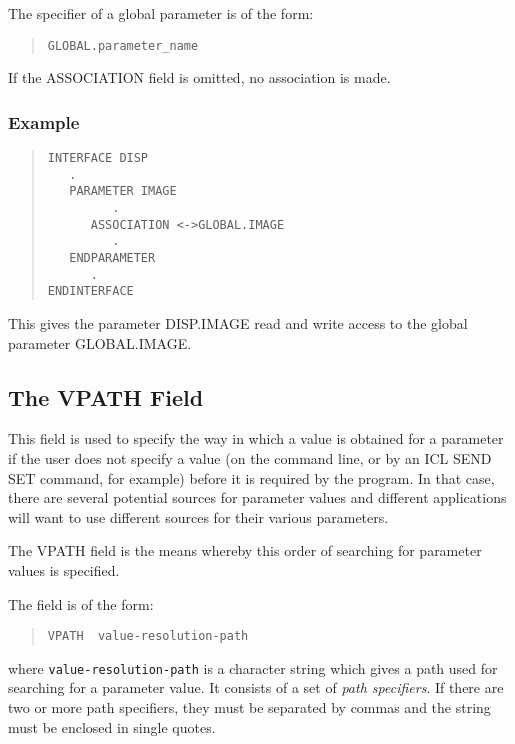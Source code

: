 \documentclass[twoside,11pt]{article}
\newcommand{\xlabel}[1]{}
\renewcommand{\_}{\texttt{\symbol{95}}}
\begin{document}
The specifier of a global parameter is of the form:
\begin{quote} \begin{verbatim}
GLOBAL.parameter_name
\end{verbatim} \end{quote}
If the ASSOCIATION field is omitted, no association is made.

\subsubsection*{Example}
\begin{quote} \begin{verbatim}
INTERFACE DISP
   .
   PARAMETER IMAGE
         .
      ASSOCIATION <->GLOBAL.IMAGE
         .
   ENDPARAMETER
      .
ENDINTERFACE
\end{verbatim} \end{quote}
This gives the parameter DISP.IMAGE read and write access to the global 
parameter GLOBAL.\-IMAGE.

\subsection{The VPATH Field
\xlabel{the_vpath_field}\label{vpath}}

This field is used to specify the way in which a value is obtained for
a parameter if the user does not specify a value (on the command line, or by
an ICL SEND SET command, for example) before it is required by the program.
In that case, there are several potential sources for parameter values and
different applications will want to use different sources for their various
parameters.

The VPATH field is the means whereby this
order of searching for parameter values is specified.

The field is of the form:
\begin{quote} \begin{verbatim}
VPATH  value-resolution-path
\end{verbatim} \end{quote}
where \texttt{value-resolution-path} is a character string which gives a path
used for searching for a parameter value.
It consists of a set of {\em path specifiers}. If there are two or more
path specifiers, they must be separated by commas and the string must be
enclosed in single quotes.
\end{document}
